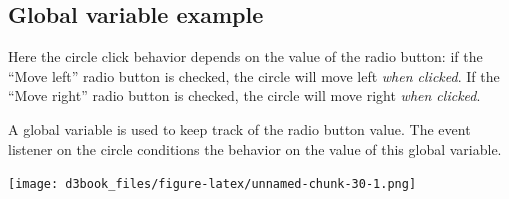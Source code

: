 \documentclass[openany]{book}
\begin{document}
\hypertarget{global-variable-example}{%
\subsection{Global variable example}\label{global-variable-example}}

Here the circle click behavior depends on the value of the radio button: if the ``Move left'' radio button is checked, the circle will move left \emph{when clicked}. If the ``Move right'' radio button is checked, the circle will move right \emph{when clicked}.

A global variable is used to keep track of the radio button value. The event listener on the circle conditions the behavior on the value of this global variable.

\texttt{[image: d3book\_files/figure-latex/unnamed-chunk-30-1.png]}
\end{document}
